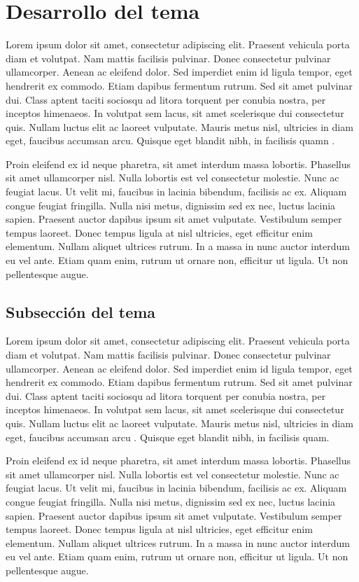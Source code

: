 \documentclass[letterpaper, 12pt, spanish]{article}
\begin{document}
\section{Desarrollo del tema}

Lorem ipsum dolor sit amet, consectetur adipiscing elit. Praesent vehicula porta diam et volutpat. Nam mattis facilisis pulvinar. Donec consectetur pulvinar ullamcorper. Aenean ac eleifend dolor. Sed imperdiet enim id ligula tempor, eget hendrerit ex commodo. Etiam dapibus fermentum rutrum. Sed sit amet pulvinar dui. Class aptent taciti sociosqu ad litora torquent per conubia nostra, per inceptos himenaeos. In volutpat sem lacus, sit amet scelerisque dui consectetur quis. Nullam luctus elit ac laoreet vulputate. Mauris metus nisl, ultricies in diam eget, faucibus accumsan arcu. Quisque eget blandit nibh, in facilisis quamn  \cite{kaplan1999}.

Proin eleifend ex id neque pharetra, sit amet interdum massa lobortis. Phasellus sit amet ullamcorper nisl. Nulla lobortis est vel consectetur molestie. Nunc ac feugiat lacus. Ut velit mi, faucibus in lacinia bibendum, facilisis ac ex. Aliquam congue feugiat fringilla. Nulla nisi metus, dignissim sed ex nec, luctus lacinia sapien. Praesent auctor dapibus ipsum sit amet vulputate. Vestibulum semper tempus laoreet. Donec tempus ligula at nisl ultricies, eget efficitur enim elementum. Nullam aliquet ultrices rutrum. In a massa in nunc auctor interdum eu vel ante. Etiam quam enim, rutrum ut ornare non, efficitur ut ligula. Ut non pellentesque augue.

\subsection{Subsección del tema}
Lorem ipsum dolor sit amet, consectetur adipiscing elit. Praesent vehicula porta diam et volutpat. Nam mattis facilisis pulvinar. Donec consectetur pulvinar ullamcorper. Aenean ac eleifend dolor. Sed imperdiet enim id ligula tempor, eget hendrerit ex commodo. Etiam dapibus fermentum rutrum. Sed sit amet pulvinar dui. Class aptent taciti sociosqu ad litora torquent per conubia nostra, per inceptos himenaeos. In volutpat sem lacus, sit amet scelerisque dui consectetur quis. Nullam luctus elit ac laoreet vulputate. Mauris metus nisl, ultricies in diam eget, faucibus accumsan arcu \cite{marr2015}. Quisque eget blandit nibh, in facilisis quam.

Proin eleifend ex id neque pharetra, sit amet interdum massa lobortis. Phasellus sit amet ullamcorper nisl. Nulla lobortis est vel consectetur molestie. Nunc ac feugiat lacus. Ut velit mi, faucibus in lacinia bibendum, facilisis ac ex. Aliquam congue feugiat fringilla. Nulla nisi metus, dignissim sed ex nec, luctus lacinia sapien. Praesent auctor dapibus ipsum sit amet vulputate. Vestibulum semper tempus laoreet. Donec tempus ligula at nisl ultricies, eget efficitur enim elementum. Nullam aliquet ultrices rutrum. In a massa in nunc auctor interdum eu vel ante. Etiam quam enim, rutrum ut ornare non, efficitur ut ligula. Ut non pellentesque augue.
\end{document}
